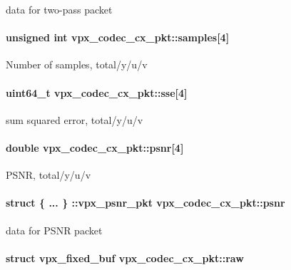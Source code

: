 data for two-\/pass packet \hypertarget{structvpx__codec__cx__pkt_a4d3fc7eb2d19c5913c6f3f474e5cf77b}{
\paragraph[{samples}]{\setlength{\rightskip}{0pt plus 5cm}unsigned int {\bf vpx\-\_\-codec\-\_\-cx\-\_\-pkt\-::samples}\mbox{[}4\mbox{]}}}\label{structvpx__codec__cx__pkt_a4d3fc7eb2d19c5913c6f3f474e5cf77b}
\-Number of samples, total/y/u/v \hypertarget{structvpx__codec__cx__pkt_ad65e918d3f26743cc7a8898b88bcb397}{
\paragraph[{sse}]{\setlength{\rightskip}{0pt plus 5cm}uint64\-\_\-t {\bf vpx\-\_\-codec\-\_\-cx\-\_\-pkt\-::sse}\mbox{[}4\mbox{]}}}\label{structvpx__codec__cx__pkt_ad65e918d3f26743cc7a8898b88bcb397}
sum squared error, total/y/u/v \hypertarget{structvpx__codec__cx__pkt_a63744aeceb50355d6402d55309c151b6}{
\paragraph[{psnr}]{\setlength{\rightskip}{0pt plus 5cm}double {\bf vpx\-\_\-codec\-\_\-cx\-\_\-pkt\-::psnr}\mbox{[}4\mbox{]}}}\label{structvpx__codec__cx__pkt_a63744aeceb50355d6402d55309c151b6}
\-P\-S\-N\-R, total/y/u/v \hypertarget{structvpx__codec__cx__pkt_ac91dc0ee23d3d939b85eb82eb5ccc042}{
\paragraph[{psnr}]{\setlength{\rightskip}{0pt plus 5cm}struct \{ ... \} \-::vpx\-\_\-psnr\-\_\-pkt  {\bf vpx\-\_\-codec\-\_\-cx\-\_\-pkt\-::psnr}}}\label{structvpx__codec__cx__pkt_ac91dc0ee23d3d939b85eb82eb5ccc042}
data for \-P\-S\-N\-R packet \hypertarget{structvpx__codec__cx__pkt_acc7ee91ea9c907aea7c3b953324f7c26}{
\paragraph[{raw}]{\setlength{\rightskip}{0pt plus 5cm}struct {\bf vpx\-\_\-fixed\-\_\-buf} {\bf vpx\-\_\-codec\-\_\-cx\-\_\-pkt\-::raw}}}\label{structvpx__codec__cx__pkt_acc7ee91ea9c907aea7c3b953324f7c26}

